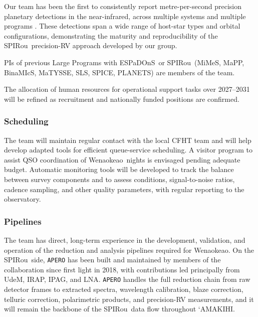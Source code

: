 \documentclass[
    traditabstract,
    longauth,
    onecolumn,
]{aa}
\def \amakihi{`AMAKIHI}
\def \spi{SPIRou}
\def \esp{ESPaDOnS}
\def \wena{Wenaokeao}
\begin{document}
Our team has been the first to consistently report metre-per-second precision planetary detections in the near-infrared, across multiple systems and multiple programs \citep{cadieux_toi-1452_2022, martioli_toi-1759_2022, moutou2024, carmona2025, cortes2025, ouldelhkim2026, charpentier2026}. These detections span a wide range of host-star types and orbital configurations, demonstrating the maturity and reproducibility of the \spi\ precision-RV approach developed by our group.

PIs of previous Large Programs with \esp\ or \spi\ (MiMeS, MaPP, BinaMIcS, MaTYSSE, SLS, SPICE, PLANETS) are members of the team.

The allocation of human resources for operational support tasks over 2027--2031 will be refined as recruitment and nationally funded positions are confirmed.

\subsubsection{Scheduling}

The team will maintain regular contact with the local CFHT team and will help develop adapted tools for efficient queue-service scheduling. A visitor program to assist QSO coordination of \wena\ nights is envisaged pending adequate budget. Automatic monitoring tools will be developed to track the balance between survey components and to assess conditions, signal-to-noise ratios, cadence sampling, and other quality parameters, with regular reporting to the observatory.

\subsubsection{Pipelines}



The team has direct, long-term experience in the development, validation, and operation of the reduction and analysis pipelines required for \wena. On the \spi\ side, \texttt{APERO} \citep{cook_apero_2022} has been built and maintained by members of the collaboration since first light in 2018, with contributions led principally from UdeM, IRAP, IPAG, and LNA. \texttt{APERO} handles the full reduction chain from raw detector frames to extracted spectra, wavelength calibration, blaze correction, telluric correction, polarimetric products, and precision-RV measurements, and it will remain the backbone of the \spi\ data flow throughout \amakihi.
\end{document}
